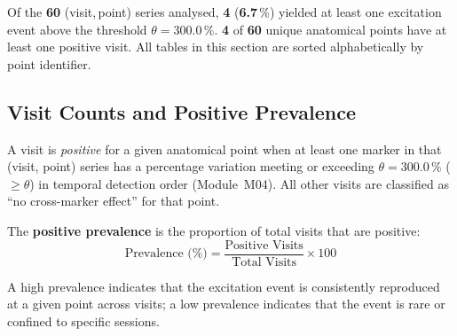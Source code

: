 \documentclass[a4paper,11pt]{article}
\begin{document}
\noindent
Of the \textbf{60} (visit,\,point) series analysed,
\textbf{4} (\textbf{6.7}\,\%) yielded at least one
excitation event above the threshold $\theta = 300.0\,\%$.
\textbf{4} of \textbf{60} unique anatomical points
have at least one positive visit.
All tables in this section are sorted alphabetically by point identifier.

\subsection{Visit Counts and Positive Prevalence}

A visit is \emph{positive} for a given anatomical point when at least one marker in that
(visit, point) series has a percentage variation meeting or exceeding
$\theta = 300.0\,\%$ ($\geq \theta$) in temporal detection order (Module~M04).
All other visits are classified as ``no cross-marker effect'' for that point.

The \textbf{positive prevalence} is the proportion of total visits that are positive:
\[
  \text{Prevalence (\%)} = \frac{\text{Positive Visits}}{\text{Total Visits}} \times 100
\]

A high prevalence indicates that the excitation event is consistently reproduced at a given
point across visits; a low prevalence indicates that the event is rare or confined to
specific sessions.
\end{document}
